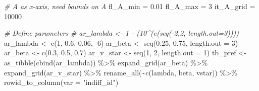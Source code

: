 \documentclass[
]{book}
\newenvironment{Shaded}{\begin{snugshade}}{\end{snugshade}}
\newcommand{\AttributeTok}[1]{\textcolor[rgb]{0.77,0.63,0.00}{#1}}
\newcommand{\CommentTok}[1]{\textcolor[rgb]{0.56,0.35,0.01}{\textit{#1}}}
\newcommand{\DecValTok}[1]{\textcolor[rgb]{0.00,0.00,0.81}{#1}}
\newcommand{\FloatTok}[1]{\textcolor[rgb]{0.00,0.00,0.81}{#1}}
\newcommand{\FunctionTok}[1]{\textcolor[rgb]{0.00,0.00,0.00}{#1}}
\newcommand{\NormalTok}[1]{#1}
\newcommand{\OtherTok}[1]{\textcolor[rgb]{0.56,0.35,0.01}{#1}}
\newcommand{\SpecialCharTok}[1]{\textcolor[rgb]{0.00,0.00,0.00}{#1}}
\newcommand{\StringTok}[1]{\textcolor[rgb]{0.31,0.60,0.02}{#1}}
\begin{document}
\begin{Shaded}
\begin{Highlighting}[]
\CommentTok{\# A as x{-}axis, need bounds on A}
\NormalTok{fl\_A\_min }\OtherTok{=} \FloatTok{0.01}
\NormalTok{fl\_A\_max }\OtherTok{=} \DecValTok{3}
\NormalTok{it\_A\_grid }\OtherTok{=} \DecValTok{10000}

\CommentTok{\# Define parameters}
\CommentTok{\# ar\_lambda \textless{}{-} 1 {-} (10\^{}(c(seq({-}2,2, length.out=3))))}
\NormalTok{ar\_lambda }\OtherTok{\textless{}{-}} \FunctionTok{c}\NormalTok{(}\DecValTok{1}\NormalTok{, }\FloatTok{0.6}\NormalTok{, }\FloatTok{0.06}\NormalTok{, }\SpecialCharTok{{-}}\DecValTok{6}\NormalTok{)}
\NormalTok{ar\_beta }\OtherTok{\textless{}{-}} \FunctionTok{seq}\NormalTok{(}\FloatTok{0.25}\NormalTok{, }\FloatTok{0.75}\NormalTok{, }\AttributeTok{length.out =} \DecValTok{3}\NormalTok{)}
\NormalTok{ar\_beta }\OtherTok{\textless{}{-}} \FunctionTok{c}\NormalTok{(}\FloatTok{0.3}\NormalTok{, }\FloatTok{0.5}\NormalTok{, }\FloatTok{0.7}\NormalTok{)}
\NormalTok{ar\_v\_star }\OtherTok{\textless{}{-}} \FunctionTok{seq}\NormalTok{(}\DecValTok{1}\NormalTok{, }\DecValTok{2}\NormalTok{, }\AttributeTok{length.out =} \DecValTok{1}\NormalTok{)}
\NormalTok{tb\_pref }\OtherTok{\textless{}{-}} \FunctionTok{as\_tibble}\NormalTok{(}\FunctionTok{cbind}\NormalTok{(ar\_lambda)) }\SpecialCharTok{\%\textgreater{}\%}
  \FunctionTok{expand\_grid}\NormalTok{(ar\_beta) }\SpecialCharTok{\%\textgreater{}\%} \FunctionTok{expand\_grid}\NormalTok{(ar\_v\_star) }\SpecialCharTok{\%\textgreater{}\%}
  \FunctionTok{rename\_all}\NormalTok{(}\SpecialCharTok{\textasciitilde{}}\FunctionTok{c}\NormalTok{(}\StringTok{\textquotesingle{}lambda\textquotesingle{}}\NormalTok{, }\StringTok{\textquotesingle{}beta\textquotesingle{}}\NormalTok{, }\StringTok{\textquotesingle{}vstar\textquotesingle{}}\NormalTok{)) }\SpecialCharTok{\%\textgreater{}\%}
  \FunctionTok{rowid\_to\_column}\NormalTok{(}\AttributeTok{var =} \StringTok{"indiff\_id"}\NormalTok{)}


\end{Highlighting}
\end{Shaded}
\end{document}
